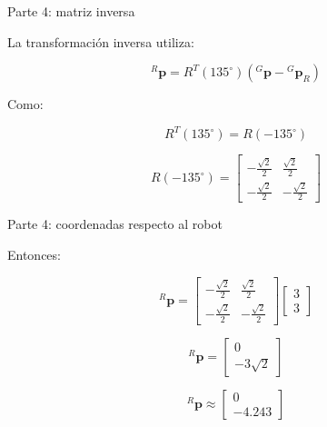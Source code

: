 \documentclass[aspectratio=169]{beamer}
\begin{document}
\begin{frame}{Parte 4: matriz inversa}

    La transformación inversa utiliza:

    \[
    {}^{R}\mathbf{p}
    =
    R^T(135^\circ)
    \left(
    {}^{G}\mathbf{p}
    -
    {}^{G}\mathbf{p}_R
    \right)
    \]

    Como:

    \[
    R^T(135^\circ)=R(-135^\circ)
    \]

    \[
    R(-135^\circ)
    =
    \begin{bmatrix}
        -\frac{\sqrt{2}}{2} & \frac{\sqrt{2}}{2}\\
        -\frac{\sqrt{2}}{2} & -\frac{\sqrt{2}}{2}
    \end{bmatrix}
    \]

\end{frame}

\begin{frame}{Parte 4: coordenadas respecto al robot}

    Entonces:

    \[
    {}^{R}\mathbf{p}
    =
    \begin{bmatrix}
        -\frac{\sqrt{2}}{2} & \frac{\sqrt{2}}{2}\\
        -\frac{\sqrt{2}}{2} & -\frac{\sqrt{2}}{2}
    \end{bmatrix}
    \begin{bmatrix}
        3\\
        3
    \end{bmatrix}
    \]

    \[
    {}^{R}\mathbf{p}
    =
    \begin{bmatrix}
        0\\
        -3\sqrt{2}
    \end{bmatrix}
    \]

    \[
    \boxed{
        {}^{R}\mathbf{p}
        \approx
        \begin{bmatrix}
            0\\
            -4.243
    \end{bmatrix}}
    \]

\end{frame}
\end{document}
